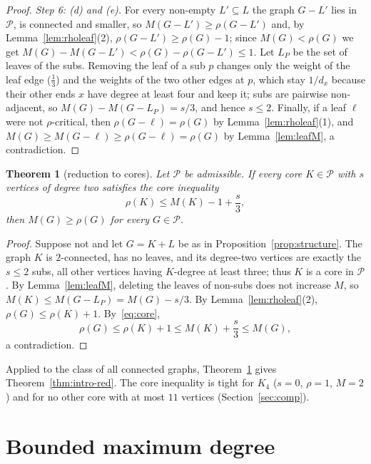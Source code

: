 \documentclass[11pt]{amsart}
\newtheorem{theorem}{Theorem}[section]
\theoremstyle{definition}
\begin{document}
\begin{proof}
\emph{Step 6: (d) and (e).} For every non-empty $L'\subseteq L$ the graph $G-L'$ lies in $\mathcal P$, is connected and
smaller, so $M(G-L')\ge\rho(G-L')$ and, by Lemma~\ref{lem:rholeaf}(2), $\rho(G-L')\ge\rho(G)-1$; since
$M(G)<\rho(G)$ we get $M(G)-M(G-L')<\rho(G)-\rho(G-L')\le1$. Let $L_P$ be the set of leaves of the subs.
Removing the leaf of a sub $p$ changes only the weight of the leaf edge ($\frac13$) and the weights of the two other
edges at $p$, which stay $1/d_x$ because their other ends $x$ have degree at least four and keep it; subs are
pairwise non-adjacent, so $M(G)-M(G-L_P)=s/3$, and hence $s\le2$. Finally, if a leaf $\ell$ were not
$\rho$-critical, then $\rho(G-\ell)=\rho(G)$ by Lemma~\ref{lem:rholeaf}(1), and
$M(G)\ge M(G-\ell)\ge\rho(G-\ell)=\rho(G)$ by Lemma~\ref{lem:leafM}, a contradiction.
\end{proof}

\begin{theorem}[reduction to cores]\label{thm:reduction}
Let $\mathcal P$ be admissible. If every core $K\in\mathcal P$ with $s$ vertices of degree two satisfies the core
inequality
\begin{equation}\label{eq:core}
  \rho(K)\le M(K)-1+\frac s3 ,
\end{equation}
then $M(G)\ge\rho(G)$ for every $G\in\mathcal P$.
\end{theorem}

\begin{proof}
Suppose not and let $G=K+L$ be as in Proposition~\ref{prop:structure}. The graph $K$ is $2$-connected, has no leaves,
and its degree-two vertices are exactly the $s\le2$ subs, all other vertices having $K$-degree at least three; thus
$K$ is a core in $\mathcal P$. By Lemma~\ref{lem:leafM}, deleting the leaves of non-subs does not increase $M$, so
$M(K)\le M(G-L_P)=M(G)-s/3$. By Lemma~\ref{lem:rholeaf}(2), $\rho(G)\le\rho(K)+1$. By~\eqref{eq:core},
\[ \rho(G)\le\rho(K)+1\le M(K)+\frac s3\le M(G), \]
a contradiction.
\end{proof}

Applied to the class of all connected graphs, Theorem~\ref{thm:reduction} gives Theorem~\ref{thm:intro-red}. The
core inequality is tight for $K_4$ ($s=0$, $\rho=1$, $M=2$) and for no other core with at most $11$ vertices
(Section~\ref{sec:comp}).

\section{Bounded maximum degree}\label{sec:degree}
\end{document}
